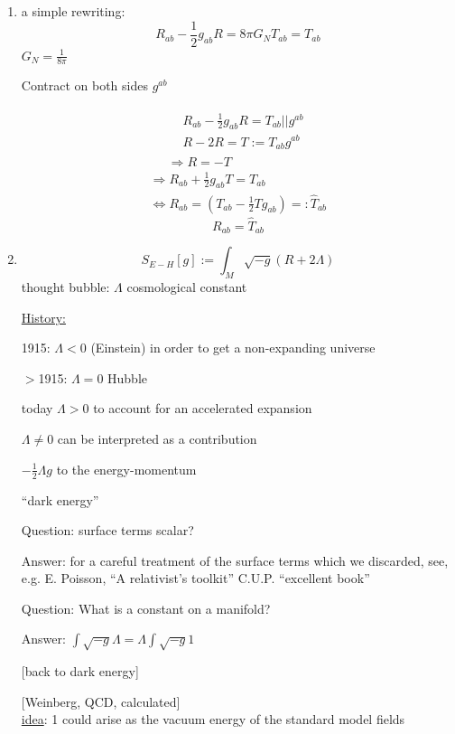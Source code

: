	\begin{enumerate}
		\item[(a)] a simple rewriting:
		\[
		R_{ab} - \frac{1}{2} g_{ab} R = 8 \pi G_N T_{ab} = T_{ab}
		\]
		$G_N = \frac{1}{8\pi}$
		
		Contract on both sides $g^{ab}$
		
		\[
		\begin{gathered}
		\begin{aligned}
		& R_{ab} - \frac{1}{2} g_{ab} R = T_{ab} || g^{ab} \\ 
		& R - 2R = T := T_{ab}g^{ab}
		\end{aligned} \\
		\Longrightarrow R = -T
		\end{gathered}
		\]
		\[
		\begin{gathered}
		\Longrightarrow R_{ab} + \frac{1}{2} g_{ab} T = T_{ab} \\
		\Longleftrightarrow R_{ab} = (T_{ab} - \frac{1}{2} Tg_{ab}) =: \widehat{T}_{ab}
		\end{gathered}
		\]
		\[
		\boxed{ R_{ab} = \widehat{T}_{ab}}
		\]
		
		\item[(b)] \[
		S_{E-H}[g] := \int_M \sqrt{-g} (R+ 2\Lambda)
		\]
		thought bubble: $\Lambda$ cosmological constant
		
		\underline{History:}
		
		1915: $\Lambda < 0$ (Einstein) in order to get a non-expanding universe
		
		$>$1915: $\Lambda =0$ Hubble 
		
		today $\Lambda > 0$ to account for an accelerated expansion
		
		$\Lambda \neq 0$ can be interpreted as a contribution
		
		$-\frac{1}{2} \Lambda g$ to the energy-momentum 
		
		``dark energy''
		
		Question: surface terms scalar?
		
		Answer: for a careful treatment of the surface terms which we discarded, see, e.g. E. Poisson, ``A relativist's toolkit'' C.U.P. ``excellent book''
		
		Question: What is a constant on a manifold?
		
		Answer: $\int \sqrt{-g} \Lambda = \Lambda \int \sqrt{-g} 1$
		
		[back to dark energy]
		
		[Weinberg, QCD, calculated] \\
		\underline{idea}: 1 could arise as the vacuum energy of the standard model fields 
		

\end{enumerate}
